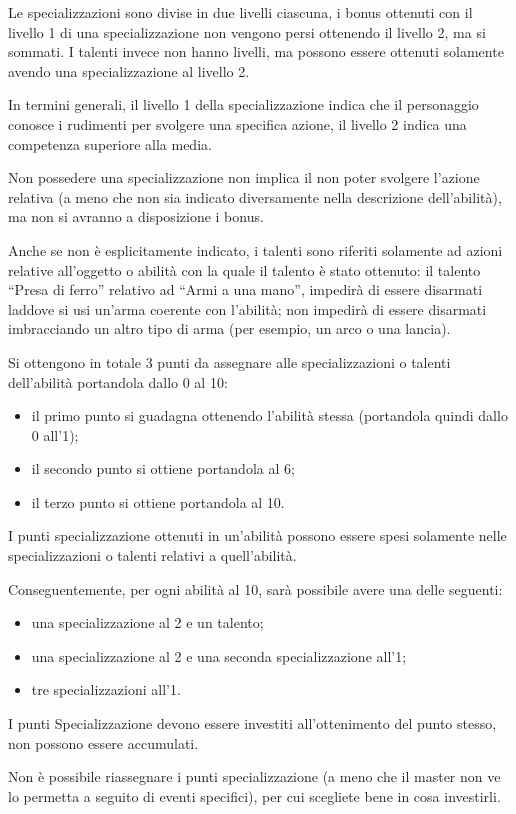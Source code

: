 \documentclass[../manuale_main.tex]{subfiles}
\begin{document}
Le specializzazioni sono divise in due livelli ciascuna, i bonus ottenuti con il livello 1 di una specializzazione non vengono persi ottenendo il livello 2, ma si sommati.
I talenti invece non hanno livelli, ma possono essere ottenuti solamente avendo una specializzazione al livello 2.

In termini generali, il livello 1 della specializzazione indica che il personaggio conosce i rudimenti per svolgere una specifica azione, il livello 2 indica una competenza superiore alla media.

Non possedere una specializzazione non implica il non poter svolgere l'azione relativa (a meno che non sia indicato diversamente nella descrizione dell'abilità), ma non si avranno a disposizione i bonus.

Anche se non è esplicitamente indicato, i talenti sono riferiti solamente ad azioni relative all'oggetto o abilità con la quale il talento è stato ottenuto: il talento ``Presa di ferro” relativo ad ``Armi a una mano”, impedirà di essere disarmati laddove si usi un'arma coerente con l'abilità; non impedirà di essere disarmati imbracciando un altro tipo di arma (per esempio, un arco o una lancia).

Si ottengono in totale 3 punti da assegnare alle specializzazioni o talenti dell'abilità portandola dallo 0 al 10:
\begin{itemize}
\item il primo punto si guadagna ottenendo l'abilità stessa (portandola quindi dallo 0 all'1);
\item il secondo punto si ottiene portandola al 6;
\item il terzo punto si ottiene portandola al 10.
\end{itemize}
I punti specializzazione ottenuti in un'abilità possono essere spesi solamente nelle specializzazioni o talenti relativi a quell'abilità.

Conseguentemente, per ogni abilità al 10, sarà possibile avere una delle seguenti:
\begin{itemize}
\item una specializzazione al 2 e un talento;
\item una specializzazione al 2 e una seconda specializzazione all'1;
\item tre specializzazioni all'1.
\end{itemize}
I punti Specializzazione devono essere investiti all'ottenimento del punto stesso, non possono essere accumulati.

Non è possibile riassegnare i punti specializzazione (a meno che il master non ve lo permetta a seguito di eventi specifici), per cui scegliete bene in cosa investirli.
\end{document}
